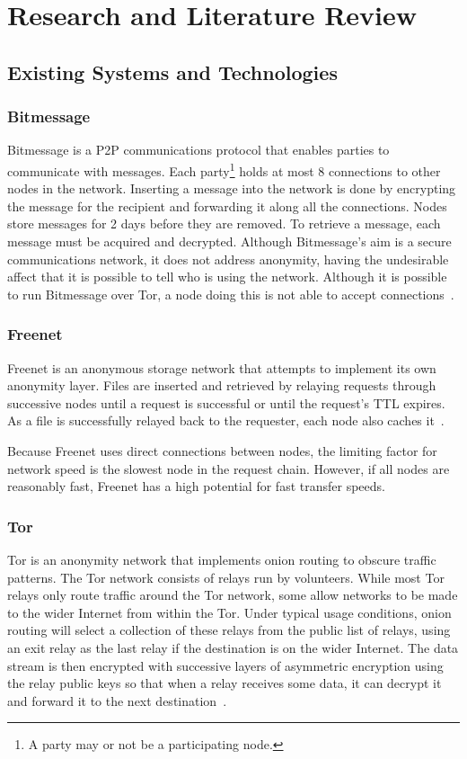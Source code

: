 \section{Research and Literature Review}

	\subsection{Existing Systems and Technologies}
		\subsubsection*{Bitmessage}\label{bitmessage_existing}
			Bitmessage is a P2P communications protocol that enables parties to communicate with messages. Each party\footnote{A party may or not be a participating node.} holds at most 8 connections to other nodes in the network. Inserting a message into the network is done by encrypting the message for the recipient and forwarding it along all the connections. Nodes store messages for 2 days before they are removed. To retrieve a message, each message must be acquired and decrypted. Although Bitmessage's aim is a secure communications network, it does not address anonymity, having the undesirable affect that it is possible to tell who is using the network. Although it is possible to run Bitmessage over Tor, a node doing this is not able to accept connections~\cite{bitmsg}.
		\subsubsection*{Freenet}\label{freenet_existing}
			Freenet is an anonymous storage network that attempts to implement its own anonymity layer. Files are inserted and retrieved by relaying requests through successive nodes until a request is successful or until the request's TTL expires. As a file is successfully relayed back to the requester, each node also caches it~\cite{clarke2001freenet}.
			
			Because Freenet uses direct connections between nodes, the limiting factor for network speed is the slowest node in the request chain. However, if all nodes are reasonably fast, Freenet has a high potential for fast transfer speeds.
		\subsubsection*{Tor}
			Tor is an anonymity network that implements onion routing to obscure traffic patterns. The Tor network consists of relays run by volunteers. While most Tor relays only route traffic around the Tor network, some allow networks to be made to the wider Internet from within the Tor. Under typical usage conditions, onion routing will select a collection of these relays from the public list of relays, using an exit relay as the last relay if the destination is on the wider Internet. The data stream is then encrypted with successive layers of asymmetric encryption using the relay public keys so that when a relay receives some data, it can decrypt it and forward it to the next destination~\cite{dingledine2004tor}.
			
